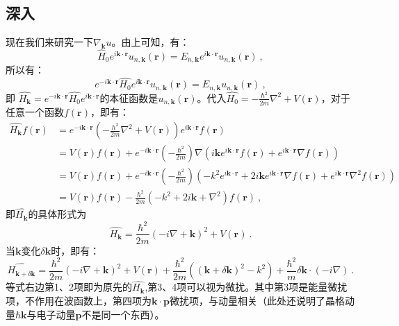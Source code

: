 \subsection{深入}
现在我们来研究一下$\nabla_{\boldsymbol{k}} u$。由上可知，有：
\begin{equation}
\hat H_0 e^{i\boldsymbol{k}\cdot\boldsymbol{r}}u_{n,\boldsymbol{k}}(\boldsymbol{r})
=E_{n,\boldsymbol{k}}e^{i\boldsymbol{k}\cdot\boldsymbol{r}}u_{n,\boldsymbol{k}}(\boldsymbol{r})~,
\end{equation}
所以有：
\begin{equation}\label{eq_anHe_1}
e^{-i\boldsymbol{k}\cdot\boldsymbol{r}}\widehat{H_0}e^{i\boldsymbol{k}\cdot\boldsymbol{r}}u_{n,\boldsymbol{k}}(\boldsymbol{r})
=E_{n,\boldsymbol{k}}u_{n,\boldsymbol{k}}(\boldsymbol{r})~,
\end{equation}
即 $\widehat{H_\boldsymbol{k}}=e^{-i\boldsymbol{k}\cdot\boldsymbol{r}}\widehat{H_0}e^{i\boldsymbol{k}\cdot\boldsymbol{r}}$的本征函数是$u_{n,\boldsymbol{k}}(\boldsymbol{r})$。代入$\widehat{H_0}=-\frac{\hbar^2}{2m}\nabla^2+V(\boldsymbol{r})$，对于任意一个函数$f(\boldsymbol{r})$，即有：
\begin{equation}
\begin{aligned}
\widehat{H_\boldsymbol{k}}f(\boldsymbol{r})&=e^{-i\boldsymbol{k}\cdot\boldsymbol{r}}(-\frac{h^2}{2m}\nabla^2+V(\boldsymbol{r}))e^{i\boldsymbol{k}\cdot\boldsymbol{r}}f(\boldsymbol{r})\\
&=V(\boldsymbol{r})f(\boldsymbol{r})+e^{-i\boldsymbol{k}\cdot\boldsymbol{r}}(-\frac{\hbar^2}{2m})\nabla(i\boldsymbol{k}e^{i\boldsymbol{k}\cdot\boldsymbol{r}}f(\boldsymbol{r})+e^{i\boldsymbol{k}\cdot\boldsymbol{r}}\nabla f(\boldsymbol{r}))\\
&=V(\boldsymbol{r})f(\boldsymbol{r})+e^{-i\boldsymbol{k}\cdot\boldsymbol{r}}(-\frac{\hbar^2}{2m})(-k^2e^{i\boldsymbol{k}\cdot\boldsymbol{r}}+2i\boldsymbol{k}e^{i\boldsymbol{k}\cdot\boldsymbol{r}}\nabla f(\boldsymbol{r})+e^{i\boldsymbol{k}\cdot\boldsymbol{r}}\nabla^2 f(\boldsymbol{r}))\\
&=V(\boldsymbol{r})f(\boldsymbol{r})-\frac{\hbar^2}{2m}(-k^2+2i\boldsymbol{k}+\nabla^2)f(\boldsymbol{r})~,
\end{aligned}
\end{equation}
即$\widehat{H_\boldsymbol{k}}$的具体形式为
\begin{equation}
\widehat{H_\boldsymbol{k}}=\frac{\hbar^2}{2m}(-i\nabla+\boldsymbol{k})^2+V(\boldsymbol{r})~.
\end{equation}
当$\boldsymbol{k}$变化$\delta\boldsymbol{k}$时，即有：
\begin{equation}
\hat{H_{\boldsymbol{k}+\delta\boldsymbol{k}}}=\frac{\hbar^2}{2m}(-i\nabla+\boldsymbol{k})^2+V(\boldsymbol{r})+\frac{\hbar^2}{2m}((\boldsymbol{k}+\delta{\boldsymbol{k}})^2-k^2)+\frac{\hbar^2}{m}\delta\boldsymbol{k}\cdot(-i\nabla)~.
\end{equation}
等式右边第1、2项即为原先的$\widehat{H_\boldsymbol{k}}$,第3、4项可以视为微扰。其中第3项是能量微扰项，不作用在波函数上，第四项为$\boldsymbol{k}\cdot\boldsymbol{p}$微扰项，与动量相关（此处还说明了晶格动量$\hbar\boldsymbol{k}$与电子动量$\boldsymbol{p}$不是同一个东西）。
